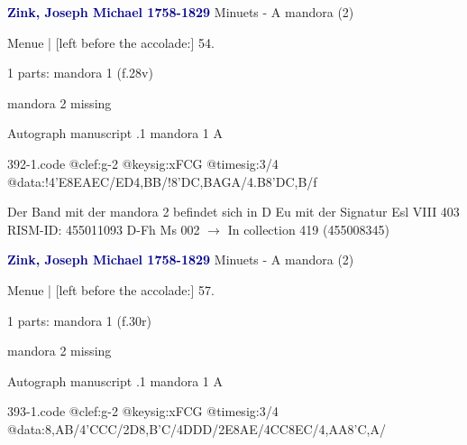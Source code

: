 \documentclass[twocolumn]{book}
\begin{document}
\newline \par \vspace{7pt} \textcolor{darkblue}{\textbf{Zink, Joseph Michael  1758-1829}}
\newline Minuets - A
\newline mandora (2)
\newline \begin{itshape}[f.28v, at left:] Menue | [left before the accolade:] 54.\end{itshape} 
\newline \textcolor{darkblue}{}  1 parts: mandora 1  (f.28v)
\newline \begin{small} mandora 2 missing\end{small} 
\newline Autograph manuscript
.1  mandora 1  A  
\begin{filecontents*}{392-1.code}
@clef:g-2
@keysig:xFCG
@timesig:3/4
@data:!4'E{8EAEC}/{ED}4,BB/!{8'DC}{,BA}{GA}/4.B8'D{C,B}/f
\end{filecontents*}
\newline
%

\newline Der Band mit der mandora 2 befindet sich in D Eu mit der Signatur Esl VIII 403
\newline RISM-ID: 455011093
\newline D-Fh  Ms 002
\newline $\rightarrow$ In collection 419 (455008345)
      
\newline \par \vspace{7pt} \textcolor{darkblue}{\textbf{Zink, Joseph Michael  1758-1829}}
\newline Minuets - A
\newline mandora (2)
\newline \begin{itshape}[f.30r, at left:] Menue | [left before the accolade:] 57.\end{itshape} 
\newline \textcolor{darkblue}{}  1 parts: mandora 1  (f.30r)
\newline \begin{small} mandora 2 missing\end{small} 
\newline Autograph manuscript
.1  mandora 1  A  
\begin{filecontents*}{393-1.code}
@clef:g-2
@keysig:xFCG
@timesig:3/4
@data:{8,AB}/4'CCC/2D{8,B'C}/4DDD/2E{8AE}/4CC{8EC}/4,AA{8'C,A}/
\end{filecontents*}
\newline
%
\end{document}
